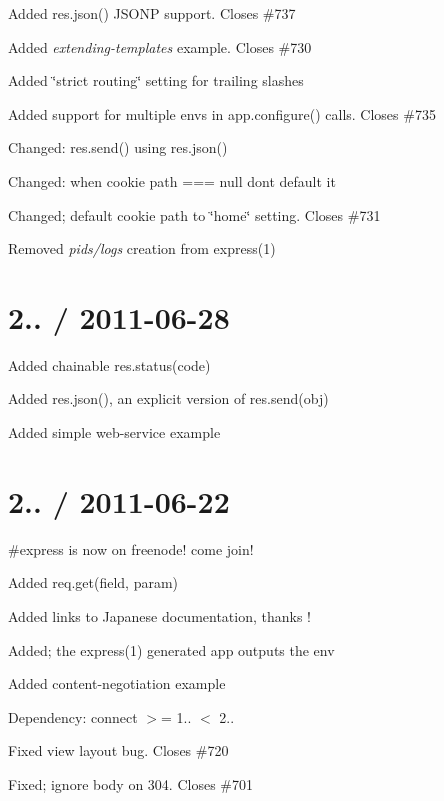 {\ttfamily 
\begin{DoxyItemize}
\item Added {\ttfamily res.\+json()} J\+S\+O\+NP support. Closes \#737
\item Added {\itshape extending-\/templates} example. Closes \#730
\item Added \char`\"{}strict routing\char`\"{} setting for trailing slashes
\item Added support for multiple envs in {\ttfamily app.\+configure()} calls. Closes \#735
\item Changed\+: {\ttfamily res.\+send()} using {\ttfamily res.\+json()}
\item Changed\+: when cookie {\ttfamily path === null} don\textquotesingle{}t default it
\item Changed; default cookie path to \char`\"{}home\char`\"{} setting. Closes \#731
\item Removed {\itshape pids/logs} creation from express(1)
\end{DoxyItemize}}

{\ttfamily \section*{2.. / 2011-\/06-\/28 }}

{\ttfamily }

{\ttfamily 
\begin{DoxyItemize}
\item Added chainable {\ttfamily res.\+status(code)}
\item Added {\ttfamily res.\+json()}, an explicit version of {\ttfamily res.\+send(obj)}
\item Added simple web-\/service example
\end{DoxyItemize}}

{\ttfamily \section*{2.. / 2011-\/06-\/22 }}

{\ttfamily }

{\ttfamily 
\begin{DoxyItemize}
\item \#express is now on freenode! come join!
\item Added {\ttfamily req.\+get(field, param)}
\item Added links to Japanese documentation, thanks !
\item Added; the {\ttfamily express(1)} generated app outputs the env
\item Added {\ttfamily content-\/negotiation} example
\item Dependency\+: connect $>$= 1.. $<$ 2..
\item Fixed view layout bug. Closes \#720
\item Fixed; ignore body on 304. Closes \#701
\end{DoxyItemize}}

